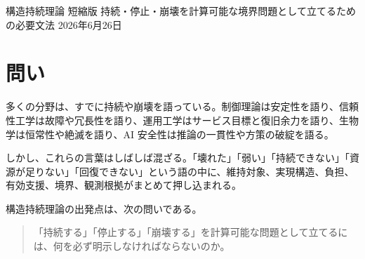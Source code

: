 \documentclass[12pt,a4paper]{article}
\begin{document}
\PaperTitleBlock
  {構造持続理論 短縮版}
  {持続・停止・崩壊を計算可能な境界問題として立てるための必要文法}
  {2026年6月26日}

\begin{abstract}
構造持続理論は、維持したい性質・機能・状態をもつ構造について、維持・停止・崩壊・回復・介入を計算可能な境界問題として扱う、Lean 形式化された境界理論である。

それは一つの問いから始まる。

\begin{quote}
「持続する」「停止する」「崩壊する」を計算可能な問題として立てるには、何を必ず明示しなければならないのか。
\end{quote}

答えは、維持対象、必要構造、存続可能領域、損失または修復込み負担、有効支援、境界、時間範囲、観測・変換器・証明書である。

この理論の中心は、持続や崩壊を単一の「資源不足」や「弱さ」として扱わず、計算可能な境界問題へ変換するための必要文法を与えることにある。数値だけなら候補計算はできる。しかし、その数値が何の維持対象について、どの必要構造の、どの負担と有効支援から出た境界読取りなのかを明示しなければ、正式な持続・停止・崩壊の読取りにはならない。

Lean 形式化版では、この必然性定理を G1 としてまとめている。この定理は、この文法が単なる便利な記法ではなく、明示された保存条件と同値条件のもとで避けられないことを読む。したがって構造持続理論は、世界を一つの式で予測する理論ではなく、各分野の観測やモデルを再現可能な持続・停止・崩壊の境界帰結へ整える理論である。
\end{abstract}

\section{問い}\label{ux554fux3044}

多くの分野は、すでに持続や崩壊を語っている。制御理論は安定性を語り、信頼性工学は故障や冗長性を語り、運用工学はサービス目標と復旧余力を語り、生物学は恒常性や絶滅を語り、AI 安全性は推論の一貫性や方策の破綻を語る。

しかし、これらの言葉はしばしば混ざる。「壊れた」「弱い」「持続できない」「資源が足りない」「回復できない」という語の中に、維持対象、実現構造、負担、有効支援、境界、観測根拠がまとめて押し込まれる。

構造持続理論の出発点は、次の問いである。

\begin{quote}
「持続する」「停止する」「崩壊する」を計算可能な問題として立てるには、何を必ず明示しなければならないのか。
\end{quote}
\end{document}
